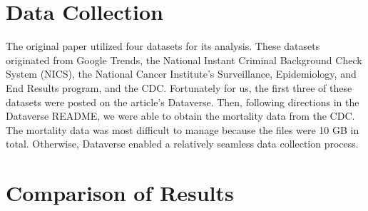 \documentclass[12pt]{article}%
\begin{document}
\section*{Data Collection}
The original paper utilized four datasets for its analysis. These datasets originated from Google Trends, the National Instant Criminal Background Check System (NICS), the National Cancer Institute's Surveillance, Epidemiology, and End Results program, and the CDC. Fortunately for us, the first three of these datasets were posted on the article's Dataverse. Then, following directions in the Dataverse README, we were able to obtain the mortality data from the CDC. The mortality data was most difficult to manage because the files were 10 GB in total. Otherwise, Dataverse enabled a relatively seamless data collection process.  
\section*{Comparison of Results}
\end{document}
